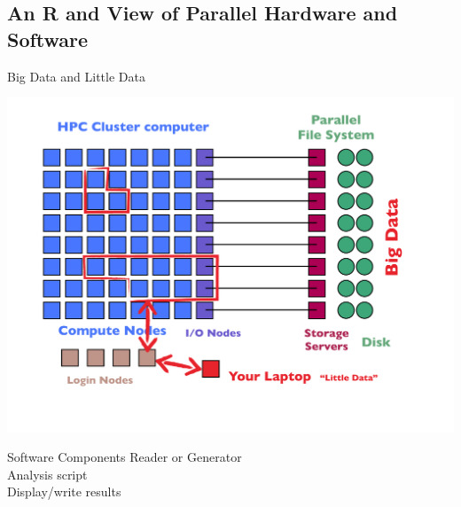 \subsection{An R and \protect\pbdR View of Parallel Hardware and Software}
\makesubcontentsslidessec

\begin{frame}{Big Data and Little Data}
\begin{minipage}{8.5cm}
  \includegraphics[trim=3cm 0cm 0cm 0cm,clip=true,height=0.9\textheight]
  {../common/pics/hardware/ParallelHardware22.pdf}\hfill
\end{minipage}
\hspace{1ex}
\begin{minipage}{3cm}\small
  \begin{block}{Software Components}\pause
    \scriptsize Reader or Generator \\
    Analysis script \\
    Display/write results
  \end{block}
\end{minipage}
\end{frame}

